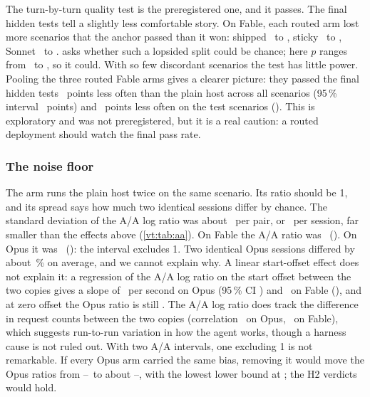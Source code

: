 The turn-by-turn quality test is the preregistered one, and it passes. The final hidden tests tell a
slightly less comfortable story. On Fable, each routed arm lost more scenarios that the anchor passed than
it won: shipped \PassFableShippedAnchorOnly\ to \PassFableShippedArmOnly, sticky
\PassFableStickyAnchorOnly\ to \PassFableStickyArmOnly, Sonnet \PassFableSonnetAnchorOnly\ to
\PassFableSonnetArmOnly.  asks whether such a lopsided split could be chance; here
$p$ ranges from \PassFableMinP\ to \PassFableMaxP, so it could. With so few discordant scenarios the test has
little power. Pooling the three routed Fable arms gives a clearer picture: they passed the final hidden tests
\FinalPoolAll\ points less often than the plain host across all scenarios (95\,\% interval
\FinalPoolAllCI\ points) and \FinalPoolTest\ points less often on the test scenarios (\FinalPoolTestCI).
This is exploratory and was not preregistered, but it is a real caution: a routed deployment should watch the
final pass rate.

\subsubsection{The noise floor}\label{vt:sec:aa}

The  arm runs the plain host twice on the same scenario. Its ratio should be 1, and its spread
says how much two identical sessions differ by chance. The standard deviation of the A/A log ratio was about
\AAAllSD\ per pair, or \AAAllSDSession\ per session, far smaller than the effects above (\cref{vt:tab:aa}). On
Fable the A/A ratio was \AAFable\ (\AAFableCI). On Opus it was \AAOpus\ (\AAOpusCI): the interval excludes 1. Two identical Opus
sessions differed by about \AAOpusPct\,\% on average, and we cannot explain why. A linear start-offset effect does not explain it: a
regression of the A/A log ratio on the start offset between the two copies gives a slope of
\RvAASlopeOpus\ per second on Opus (95\,\% CI \RvAASlopeOpusCI) and \RvAASlopeFable\ on Fable (\RvAASlopeFableCI),
and at zero offset the Opus ratio is still \RvAAInterceptOpus. The A/A log ratio does track the difference in
request counts between the two copies (correlation \RvAAReqCorrOpus\ on Opus, \RvAAReqCorrFable\ on Fable), which
suggests run-to-run variation in how the agent works, though a harness cause is not ruled out. With two A/A intervals, one
excluding 1 is not remarkable. If every Opus arm carried the same bias, removing it would move the Opus ratios from
\CfOpusStickyPairTwo--\CfOpusSonnetPairTwo\ to about \OpusAdjLow--\OpusAdjHigh, with the lowest lower bound at
\OpusAdjMinLower; the H2 verdicts would hold.

